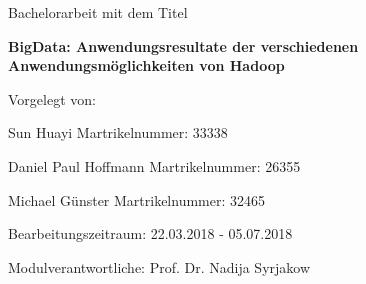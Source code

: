 \documentclass[12pt,ngerman,twoside]{scrartcl}
\begin{document}


\pagestyle{empty}

\begin{titlepage}
\centering
\begin{figure}[htbp]
\hspace*{3.3cm}
\end{figure}
        {\normalsize Bachelorarbeit mit dem Titel\par}
        {\LARGE\bfseries BigData: Anwendungsresultate der verschiedenen Anwendungsmöglichkeiten von Hadoop \par}
\vspace{1.0cm}

\vspace{1.0cm}
        Vorgelegt von:\par
        Sun Huayi
        Martrikelnummer: 33338 \par
        Daniel Paul Hoffmann 
        Martrikelnummer: 26355 \par 
        Michael Günster 
        Martrikelnummer: 32465 \par
        Bearbeitungszeitraum: 22.03.2018 - 05.07.2018

\vspace*{\fill}
{\small
        Modulverantwortliche: Prof. Dr. Nadija Syrjakow\par}
\end{titlepage}

\cleardoublepage

\newpage
\tableofcontents				%
\setcounter{page}{1}


\pagestyle{fancy}
\fancyhf{}
\fancyhead[LE]{\leftmark}
\fancyhead[RO]{\rightmark}
\fancyfoot[LE,RO]{\thepage}


\newpage





\newpage





\newpage



\end{document}
